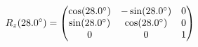 \documentclass[preview]{standalone}
\begin{document}
\begin{align*}
\special{dvisvgm:raw <g id='unique000'>}R_z(28.0^\circ) = \begin{pmatrix} \cos(28.0^\circ) & -\sin(28.0^\circ) & 0 \\ \sin(28.0^\circ) & \cos(28.0^\circ) & 0 \\ 0 & 0 & 1 \end{pmatrix}\special{dvisvgm:raw </g>}
\end{align*}
\end{document}
